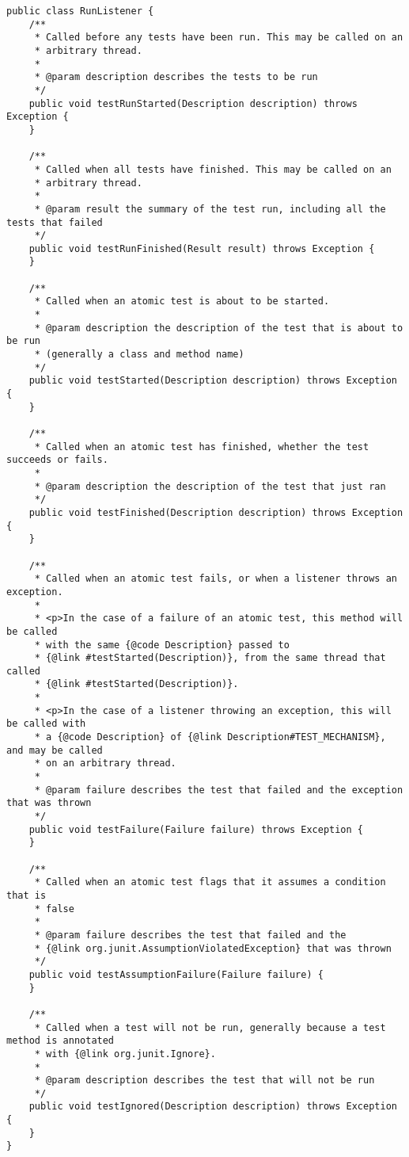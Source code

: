 \begin{lstlisting}[caption=С помощью JUnit RunListener можно собирать информацию о ходе выполения теста.]
public class RunListener {
    /**
     * Called before any tests have been run. This may be called on an
     * arbitrary thread.
     *
     * @param description describes the tests to be run
     */
    public void testRunStarted(Description description) throws Exception {
    }

    /**
     * Called when all tests have finished. This may be called on an
     * arbitrary thread.
     *
     * @param result the summary of the test run, including all the tests that failed
     */
    public void testRunFinished(Result result) throws Exception {
    }

    /**
     * Called when an atomic test is about to be started.
     *
     * @param description the description of the test that is about to be run
     * (generally a class and method name)
     */
    public void testStarted(Description description) throws Exception {
    }

    /**
     * Called when an atomic test has finished, whether the test succeeds or fails.
     *
     * @param description the description of the test that just ran
     */
    public void testFinished(Description description) throws Exception {
    }

    /**
     * Called when an atomic test fails, or when a listener throws an exception.
     *
     * <p>In the case of a failure of an atomic test, this method will be called
     * with the same {@code Description} passed to
     * {@link #testStarted(Description)}, from the same thread that called
     * {@link #testStarted(Description)}.
     *
     * <p>In the case of a listener throwing an exception, this will be called with
     * a {@code Description} of {@link Description#TEST_MECHANISM}, and may be called
     * on an arbitrary thread.
     *
     * @param failure describes the test that failed and the exception that was thrown
     */
    public void testFailure(Failure failure) throws Exception {
    }

    /**
     * Called when an atomic test flags that it assumes a condition that is
     * false
     *
     * @param failure describes the test that failed and the
     * {@link org.junit.AssumptionViolatedException} that was thrown
     */
    public void testAssumptionFailure(Failure failure) {
    }

    /**
     * Called when a test will not be run, generally because a test method is annotated
     * with {@link org.junit.Ignore}.
     *
     * @param description describes the test that will not be run
     */
    public void testIgnored(Description description) throws Exception {
    }
}
\end{lstlisting}


